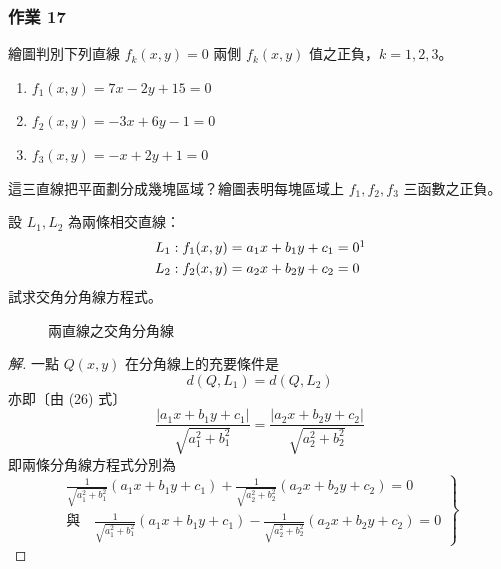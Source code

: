 \subsubsection*{作業 17}
繪圖判別下列直線 $f_k(x, y) = 0$ 兩側 $f_k(x, y)$ 值之正負，$k = 1, 2, 3$。
\begin{enumerate}[label=(\roman*), leftmargin=2em]
  \item $f_1(x, y) = 7x - 2y + 15 = 0$
  \item $f_2(x, y) = -3x + 6y - 1 = 0$
  \item $f_3(x, y) = -x + 2y + 1 = 0$
\end{enumerate}
這三直線把平面劃分成幾塊區域？繪圖表明每塊區域上 $f_1, f_2, f_3$ 三函數之正負。

\begin{example}[論例 5]\label{note:b3-ch4-p177-l1-l2-subscripts}
設 $L_1, L_2$ 為兩條相交直線：
\begin{align*}
L_1 &: f_1(x, y) = a_1 x + b_1 y + c_1 = 0\footnotemark \\
L_2 &: f_2(x, y) = a_2 x + b_2 y + c_2 = 0
\end{align*}
試求交角分角線方程式。
\end{example}

\begin{figure}[H]
\centering
{}
\caption{兩直線之交角分角線}
\label{fig:4-34}
\end{figure}

\begin{proof}[解]
一點 $Q(x, y)$ 在分角線上的充要條件是
\[ d(Q, L_1) = d(Q, L_2) \]
亦即〔由 (26) 式〕
\[ \frac{|a_1 x + b_1 y + c_1|}{\sqrt{a_1^2 + b_1^2}} = \frac{|a_2 x + b_2 y + c_2|}{\sqrt{a_2^2 + b_2^2}} \]
即兩條分角線方程式分別為
\begin{equation}
\left.
\begin{aligned}
\frac{1}{\sqrt{a_1^2 + b_1^2}}(a_1 x + b_1 y + c_1) + \frac{1}{\sqrt{a_2^2 + b_2^2}}(a_2 x + b_2 y + c_2) = 0 \\
\text{與}\quad \frac{1}{\sqrt{a_1^2 + b_1^2}}(a_1 x + b_1 y + c_1) - \frac{1}{\sqrt{a_2^2 + b_2^2}}(a_2 x + b_2 y + c_2) = 0
\end{aligned}
\right\}
\label{eq:b3-4-27}
\end{equation}
\end{proof}

